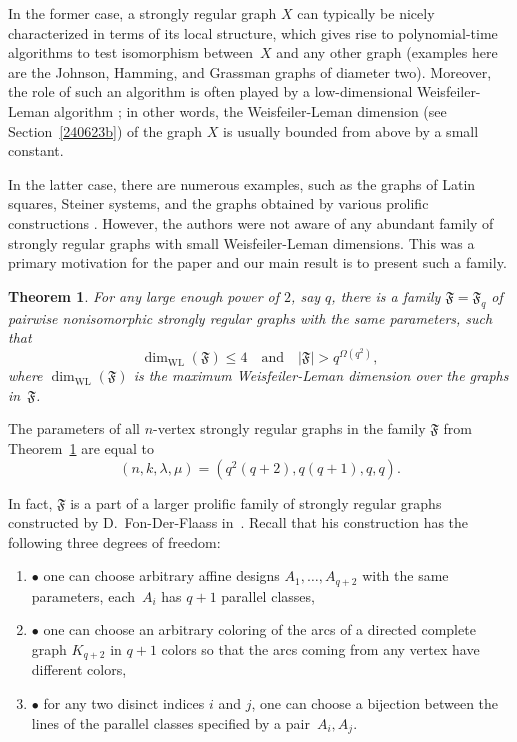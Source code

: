 \documentclass{amsart}
\newtheorem{theorem}[formula]{Theorem}
\def\thrml#1{\begin{theorem}\label{#1}}
\def\ethrm{\end{theorem}}
\def\nmrt{\begin{enumerate}}
\def\enmrt{\end{enumerate}}
\def\qtnl#1{\begin{equation}\label{#1}}
\def\eqtn{\end{equation}}
\def\fF{{\mathfrak F}}
\DeclareMathOperator{\WL}{WL}
\def\qaq{\quad\text{and}\quad}
\begin{document}
In the former case, a strongly regular graph $X$ can typically be
nicely characterized in terms of its local structure, which gives 
rise to polynomial-time algorithms to test isomorphism between~$X$ 
and any other graph (examples here are the Johnson, Hamming, and 
Grassman graphs of diameter two). Moreover, the role 
of such an algorithm is often played by a low-dimensional 
Weisfeiler-Leman algorithm \cite{EvdP2000,Ponomarenko2020a}; 
in other words, the Weisfeiler-Leman dimension 
(see Section~\ref{240623b}) of the graph $X$ is usually bounded 
from above by a small constant.

In the latter case, there are numerous examples, such as 
the graphs of Latin squares, Steiner systems, and the graphs 
obtained by various prolific constructions  \cite{FonDF2002,Ihringer2017,Muzychuk2009F,VVK,BIK}.
However, the authors were not aware of any abundant family 
of strongly regular graphs with small Weisfeiler-Leman dimensions. 
This was a primary motivation for the  paper and our main result is to present such a family. 

\thrml{050623a}
For any large enough power of $2$, say $q$, 
there is a family $\fF=\fF_q$ of pairwise nonisomorphic 
strongly regular graphs with the same parameters,  
such that 
\qtnl{220623g}
\dim_{\scriptscriptstyle\WL}(\fF)\le 4\qaq|\fF|>q^{\mathsf{\Omega}(q^2)},
\eqtn
where $\dim_{\scriptscriptstyle\WL}(\fF)$
is the maximum Weisfeiler-Leman dimension over the graphs 
in~$\fF$.
\ethrm

The parameters of all $n$-vertex  strongly regular graphs in  the family $\fF$ from Theorem~\ref{050623a} are equal to  
\qtnl{220623a}
(n,k,\lambda,\mu)=(q^2(q+2),q(q+1),q,q ).
\eqtn 

In fact, $\fF$ is a part of a larger prolific  family 
of  strongly regular graphs constructed by D.~Fon-Der-Flaass in~\cite{FonDF2002}. Recall that his construction has the following three degrees of freedom:
\nmrt
\item[$\bullet$] one can choose arbitrary affine designs $A_1,\ldots,A_{q+2}$ with the same parameters, each~$A_i$ has  $q+1$ parallel classes, 
\item[$\bullet$] one can choose an arbitrary coloring of the arcs  of a directed complete graph $K_{q+2}$  in $q+1$ colors so that the arcs coming from any vertex have different colors,
\item[$\bullet$] for any two disinct indices $i$ and $j$, one can 
choose a bijection between the lines of the parallel classes 
specified by a pair~$A_i,A_j$.
\enmrt
\end{document}
